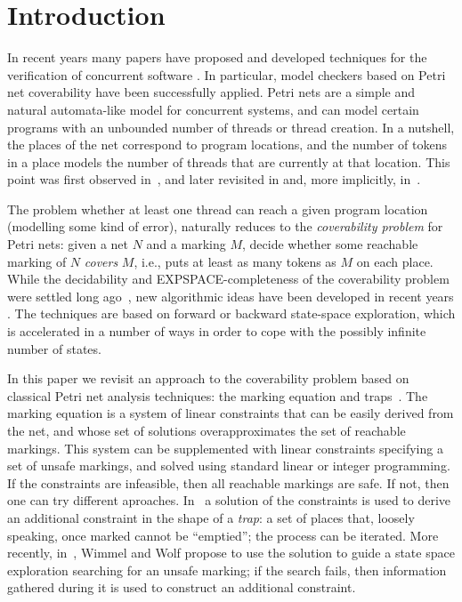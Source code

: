 \chapter{Introduction}
\label{chap:introduction}

In recent years many papers have proposed and developed techniques for
the verification of concurrent software
\cite{KaiserKW10,GantyM12,BouajjaniE14,KaiserKW12,DOsualdoKO13}.
In particular, model checkers based on Petri net coverability have been successfully applied.  
Petri nets are a simple and natural automata-like model for concurrent systems, and 
can model certain programs with an unbounded
number of threads or thread creation. In a nutshell, the places of the
net correspond to program locations, and the number of tokens in a place
models the number of threads that are currently at that location. This
point was first observed in~\cite{GermanS92}, and later revisited in
\cite{DelzannoRB02} and, more implicitly, in~\cite{KaiserKW10,GantyM12}.

The problem whether at least one thread can reach a given program
location (modelling some kind of error), naturally reduces to the
\emph{coverability problem} for Petri nets: given a net $N$ and a marking
$M$, decide whether some reachable marking of $N$ \emph{covers} $M$,
i.e., puts at least as many tokens as $M$ on each place. While the
decidability and EXPSPACE-completeness of the coverability problem
were settled long ago~\cite{KarpM69,Rackoff78}, new algorithmic ideas
have been developed in recent years
\cite{GeeraertsRB06,GantyRB08,ValmariH14,KaiserKW12,KloosMNP13}. The techniques are based on forward or backward state-space 
exploration, which is accelerated in a number of ways in order to cope 
with the possibly infinite number of states.

In this paper we revisit an approach to the coverability problem based
on classical Petri net analysis techniques: the marking equation and
traps~\cite{Murata89,Reisig13}.
The marking equation is a system of linear constraints that can be
easily derived from the net, and whose set of solutions
overapproximates the set of reachable markings. This system
can be supplemented with linear constraints specifying a set of unsafe
markings, and solved using standard linear or integer programming. If
the constraints are infeasible, then all reachable markings are safe. If
not, then one can try different aproaches. In~\cite{EsparzaMelzer00}
a solution of the constraints is used to derive an additional constraint 
in the shape of a \emph{trap}: a set of places that, loosely speaking, once 
marked cannot be ``emptied''; the process can be iterated. More recently,
in~\cite{WimmelWolf12}, Wimmel and Wolf propose to use the solution to guide a
state space exploration searching for an unsafe marking; if the search fails, 
then information gathered during it is used to construct an additional
constraint. 

